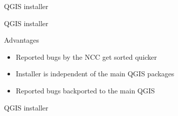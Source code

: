 \begin{frame}{QGIS installer}
	
	
\end{frame}

\begin{frame}{QGIS installer}
		\begin{block}{Advantages}
			\begin{itemize}
				\item Reported bugs by the NCC get sorted quicker
				\item Installer is independent of the main QGIS packages
				\item Reported bugs backported to the main QGIS
			\end{itemize}
		\end{block}
	
\end{frame}

\begin{frame}{QGIS installer}
	
\end{frame}

